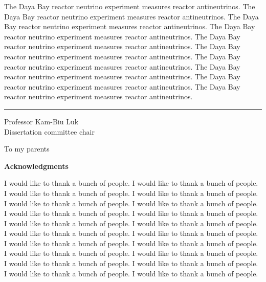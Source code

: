 \documentclass[11pt,oneside]{memoir}
\makeatletter
\def\MyDoubleSpacing{%
\setSpacing{2}%
}
\makeatother
\begin{document}
\normalsize
\MyDoubleSpacing
\noindent The Daya Bay reactor neutrino experiment measures reactor
antineutrinos. The Daya Bay reactor neutrino experiment measures reactor
antineutrinos. The Daya Bay reactor neutrino experiment measures reactor
antineutrinos. The Daya Bay reactor neutrino experiment measures reactor
antineutrinos. The Daya Bay reactor neutrino experiment measures reactor
antineutrinos. The Daya Bay reactor neutrino experiment measures reactor
antineutrinos. The Daya Bay reactor neutrino experiment measures reactor
antineutrinos. The Daya Bay reactor neutrino experiment measures reactor
antineutrinos. The Daya Bay reactor neutrino experiment measures reactor
antineutrinos. The Daya Bay reactor neutrino experiment measures reactor
antineutrinos. 

\SingleSpacing
\vspace{2.5\baselineskip}
\hfill
\begin{minipage}{0.4\textwidth}
  \hrule\vspace{0.4\baselineskip}
  Professor Kam-Biu Luk\\
  Dissertation committee chair
\end{minipage}

\clearpage

\thispagestyle{empty}
\vfill
\begin{vplace}
  \begin{center}
    {\large To my parents}
  \end{center}
\end{vplace}
\clearpage

\MyDoubleSpacing
\thispagestyle{empty}
\begin{center}
  {\large\textbf{Acknowledgments}} 
\end{center}

\noindent \normalsize
I would like to thank a bunch of people. I would like to thank a bunch of people. I would like to thank a bunch of people. I would like to thank a bunch of people. I would like to thank a bunch of people. I would like to thank a bunch of people. I would like to thank a bunch of people. I would like to thank a bunch of people. I would like to thank a bunch of people. I would like to thank a bunch of people. I would like to thank a bunch of people. I would like to thank a bunch of people. I would like to thank a bunch of people. I would like to thank a bunch of people. I would like to thank a bunch of people. I would like to thank a bunch of people. I would like to thank a bunch of people. I would like to thank a bunch of people. I would like to thank a bunch of people. I would like to thank a bunch of people. 

\frontmatter
\SingleSpacing


\tableofcontents*{}
\clearpage
\listoffigures
\clearpage
\listoftables

\mainmatter
\MyDoubleSpacing



\backmatter

\printbibliography
\end{document}
